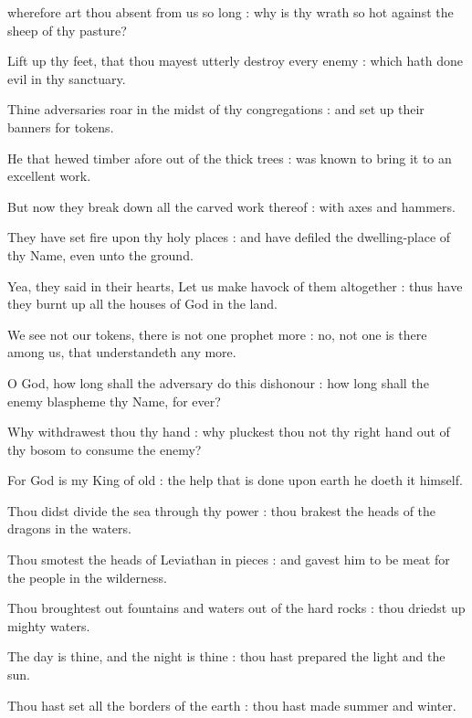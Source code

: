  wherefore art thou absent from us so long : why is thy wrath so hot against the sheep of thy pasture?\par
{}
Lift up thy feet, that thou mayest utterly destroy every enemy : which hath done evil in thy sanctuary.\par
{}Thine adversaries roar in the midst of thy congregations : and set up their banners for tokens.\par
{}He that hewed timber afore out of the thick trees : was known to bring it to an excellent work.\par
{}But now they break down all the carved work thereof : with axes and hammers.\par
{}They have set fire upon thy holy places : and have defiled the dwelling-place of thy Name, even unto the ground.\par
{}Yea, they said in their hearts, Let us make havock of them altogether : thus have they burnt up all the houses of God in the land.\par
{}We see not our tokens, there is not one prophet more : no, not one is there among us, that understandeth any more.\par
{}O God, how long shall the adversary do this dishonour : how long shall the enemy blaspheme thy Name, for ever?\par
{}Why withdrawest thou thy hand : why pluckest thou not thy right hand out of thy bosom to consume the enemy?\par
{}For God is my King of old : the help that is done upon earth he doeth it himself.\par
{}Thou didst divide the sea through thy power : thou brakest the heads of the dragons in the waters.\par
{}Thou smotest the heads of Leviathan in pieces : and gavest him to be meat for the people in the wilderness.\par
{}Thou broughtest out fountains and waters out of the hard rocks : thou driedst up mighty waters.\par
{}The day is thine, and the night is thine : thou hast prepared the light and the sun.\par
{}Thou hast set all the borders of the earth : thou hast made summer and winter.\par
